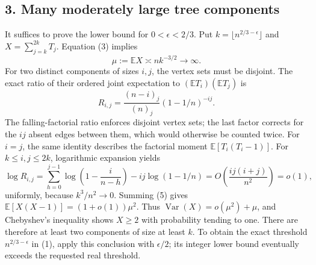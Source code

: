 \subsection*{3. Many moderately large tree components}
It suffices to prove the lower bound for $0<\epsilon<2/3$. Put $k=\lfloor n^{2/3-\epsilon}\rfloor$ and $X=\sum_{j=k}^{2k}T_j$. Equation (3) implies
\[
 \mu:=\mathbb E X\asymp nk^{-3/2}\longrightarrow\infty. \tag{4}
\]
For two distinct components of sizes $i,j$, the vertex sets must be disjoint. The exact ratio of their ordered joint expectation to $(\mathbb ET_i)(\mathbb ET_j)$ is
\[
 R_{i,j}=\frac{(n-i)_j}{(n)_j}(1-1/n)^{-ij}. \tag{5}
\]
The falling-factorial ratio enforces disjoint vertex sets; the last factor corrects for the $ij$ absent edges between them, which would otherwise be counted twice. For $i=j$, the same identity describes the factorial moment $\mathbb E[T_i(T_i-1)]$.
For $k\le i,j\le2k$, logarithmic expansion yields
\[
 \log R_{i,j}
 =\sum_{h=0}^{j-1}\log\left(1-\frac{i}{n-h}\right)-ij\log(1-1/n)
 =O\left(\frac{ij(i+j)}{n^2}\right)=o(1),
\]
uniformly, because $k^3/n^2\to0$. Summing (5) gives $\mathbb E[X(X-1)]=(1+o(1))\mu^2$. Thus $\operatorname{Var}(X)=o(\mu^2)+\mu$, and Chebyshev's inequality shows $X\ge2$ with probability tending to one. There are therefore at least two components of size at least $k$.
To obtain the exact threshold $n^{2/3-\epsilon}$ in (1), apply this conclusion with $\epsilon/2$; its integer lower bound eventually exceeds the requested real threshold.
